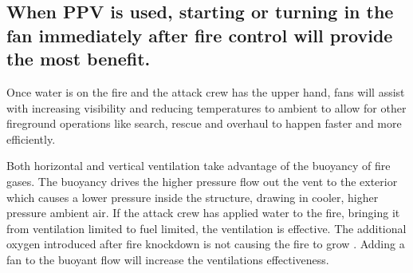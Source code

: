 \documentclass{article}
\begin{document}
\subsection{When PPV is used, starting or turning in the fan immediately after fire control will provide the most benefit.}  
Once water is on the fire and the attack crew has the upper hand, fans will assist with increasing visibility and reducing temperatures to ambient to allow for other fireground operations like search, rescue and overhaul to happen faster and more efficiently.  

Both horizontal and vertical ventilation take advantage of the buoyancy of fire gases. The buoyancy drives the higher pressure flow out the vent to the exterior which causes a lower pressure inside the structure, drawing in cooler, higher pressure ambient air. If the attack crew has applied water to the fire, bringing it from ventilation limited to fuel limited, the ventilation is effective. The additional oxygen introduced after fire knockdown is not causing the fire to grow \cite{DHS2008} \cite{DHS2010}. Adding a fan to the buoyant flow will increase the ventilations effectiveness. 
\end{document}
